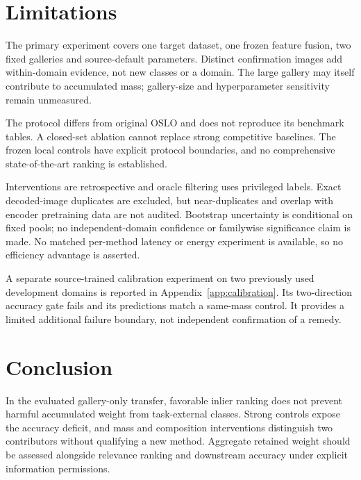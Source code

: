 \section{Limitations}
The primary experiment covers one target dataset, one frozen feature fusion, two fixed galleries and source-default parameters. Distinct confirmation images add within-domain evidence, not new classes or a domain. The large gallery may itself contribute to accumulated mass; gallery-size and hyperparameter sensitivity remain unmeasured.

The protocol differs from original OSLO and does not reproduce its benchmark tables. A closed-set ablation cannot replace strong competitive baselines. The frozen local controls have explicit protocol boundaries, and no comprehensive state-of-the-art ranking is established.

Interventions are retrospective and oracle filtering uses privileged labels. Exact decoded-image duplicates are excluded, but near-duplicates and overlap with encoder pretraining data are not audited. Bootstrap uncertainty is conditional on fixed pools; no independent-domain confidence or familywise significance claim is made. No matched per-method latency or energy experiment is available, so no efficiency advantage is asserted.

A separate source-trained calibration experiment on two previously used development domains is reported in Appendix~\ref{app:calibration}. Its two-direction accuracy gate fails and its predictions match a same-mass control. It provides a limited additional failure boundary, not independent confirmation of a remedy.

\section{Conclusion}
In the evaluated gallery-only transfer, favorable inlier ranking does not prevent harmful accumulated weight from task-external classes. Strong controls expose the accuracy deficit, and mass and composition interventions distinguish two contributors without qualifying a new method. Aggregate retained weight should be assessed alongside relevance ranking and downstream accuracy under explicit information permissions.
